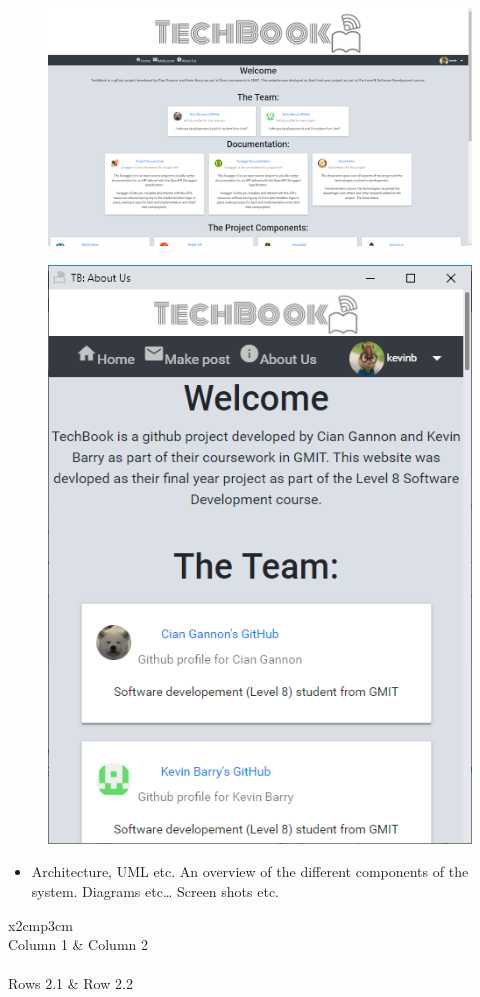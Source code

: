 \begin{figure}[H]
\centering
\begin{minipage}{.75\textwidth}
  \centering
  \includegraphics[width=.9\linewidth]{img/ui/about_PC.PNG}
  \label{fig:aboutPC}
\end{minipage}%
\begin{minipage}{.25\textwidth}
  \centering
  \includegraphics[width=.9\linewidth]{img/ui/about_MOBILE.PNG}
  \label{fig:aboutMobile}
\end{minipage}
\end{figure}
\begin{itemize}
\item Architecture, UML etc. An overview of the different components of the system. Diagrams etc… Screen shots etc.
\end{itemize}

\begin{table}[h]
  \centering
  \begin{tabular}{x{2cm}p{3cm}}
    \toprule \\
    Column 1 & Column 2 \\
    \midrule \\
    Rows 2.1 & Row 2.2 \\
    \bottomrule
  \end{tabular}
  \caption{A table.}
  \label{table:mytable}
\end{table}
